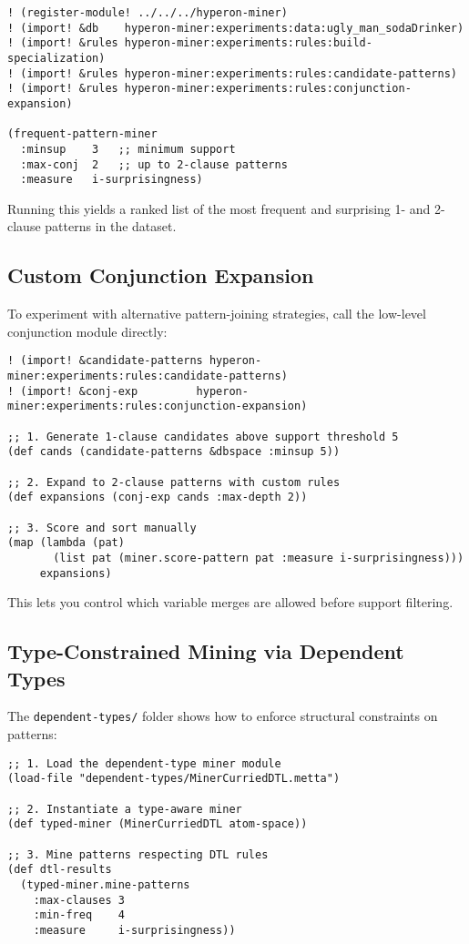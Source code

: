 \documentclass{article}
\begin{document}
\begin{verbatim}
! (register-module! ../../../hyperon-miner)
! (import! &db    hyperon-miner:experiments:data:ugly_man_sodaDrinker)
! (import! &rules hyperon-miner:experiments:rules:build-specialization)
! (import! &rules hyperon-miner:experiments:rules:candidate-patterns)
! (import! &rules hyperon-miner:experiments:rules:conjunction-expansion)

(frequent-pattern-miner
  :minsup    3   ;; minimum support
  :max-conj  2   ;; up to 2-clause patterns
  :measure   i-surprisingness)
\end{verbatim}

Running this yields a ranked list of the most frequent and surprising 1- and 2-clause patterns in the dataset.

\subsection{Custom Conjunction Expansion}

To experiment with alternative pattern-joining strategies, call the low-level conjunction module directly:

\begin{verbatim}
! (import! &candidate-patterns hyperon-miner:experiments:rules:candidate-patterns)
! (import! &conj-exp         hyperon-miner:experiments:rules:conjunction-expansion)

;; 1. Generate 1-clause candidates above support threshold 5
(def cands (candidate-patterns &dbspace :minsup 5))

;; 2. Expand to 2-clause patterns with custom rules
(def expansions (conj-exp cands :max-depth 2))

;; 3. Score and sort manually
(map (lambda (pat)
       (list pat (miner.score-pattern pat :measure i-surprisingness)))
     expansions)
\end{verbatim}

This lets you control which variable merges are allowed before support filtering.

\subsection{Type-Constrained Mining via Dependent Types}

The \texttt{dependent-types/} folder shows how to enforce structural constraints on patterns:

\begin{verbatim}
;; 1. Load the dependent-type miner module
(load-file "dependent-types/MinerCurriedDTL.metta")

;; 2. Instantiate a type-aware miner
(def typed-miner (MinerCurriedDTL atom-space))

;; 3. Mine patterns respecting DTL rules
(def dtl-results
  (typed-miner.mine-patterns
    :max-clauses 3
    :min-freq    4
    :measure     i-surprisingness))
\end{verbatim}
\end{document}

